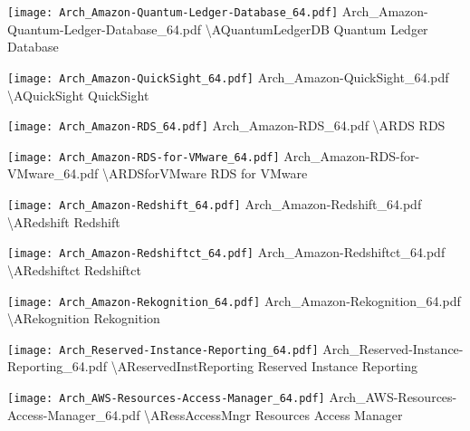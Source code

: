  {\texttt{[image: Arch\_Amazon-Quantum-Ledger-Database\_64.pdf]}} {Arch\_Amazon-Quantum-Ledger-Database\_64.pdf} {{\textbackslash}AQuantumLedgerDB} {Quantum Ledger Database}

 {\texttt{[image: Arch\_Amazon-QuickSight\_64.pdf]}} {Arch\_Amazon-QuickSight\_64.pdf} {{\textbackslash}AQuickSight} {QuickSight}

 {\texttt{[image: Arch\_Amazon-RDS\_64.pdf]}} {Arch\_Amazon-RDS\_64.pdf} {{\textbackslash}ARDS} {RDS}

 {\texttt{[image: Arch\_Amazon-RDS-for-VMware\_64.pdf]}} {Arch\_Amazon-RDS-for-VMware\_64.pdf} {{\textbackslash}ARDSforVMware} {RDS for VMware}

 {\texttt{[image: Arch\_Amazon-Redshift\_64.pdf]}} {Arch\_Amazon-Redshift\_64.pdf} {{\textbackslash}ARedshift} {Redshift}

 {\texttt{[image: Arch\_Amazon-Redshiftct\_64.pdf]}} {Arch\_Amazon-Redshiftct\_64.pdf} {{\textbackslash}ARedshiftct} {Redshiftct}

 {\texttt{[image: Arch\_Amazon-Rekognition\_64.pdf]}} {Arch\_Amazon-Rekognition\_64.pdf} {{\textbackslash}ARekognition} {Rekognition}

 {\texttt{[image: Arch\_Reserved-Instance-Reporting\_64.pdf]}} {Arch\_Reserved-Instance-Reporting\_64.pdf} {{\textbackslash}AReservedInstReporting} {Reserved Instance Reporting}

 {\texttt{[image: Arch\_AWS-Resources-Access-Manager\_64.pdf]}} {Arch\_AWS-Resources-Access-Manager\_64.pdf} {{\textbackslash}ARessAccessMngr} {Resources Access Manager}

